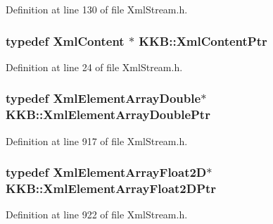 Definition at line 130 of file Xml\+Stream.\+h.

\subsubsection[{\texorpdfstring{Xml\+Content\+Ptr}{XmlContentPtr}}]{\setlength{\rightskip}{0pt plus 5cm}typedef {\bf Xml\+Content} $\ast$ {\bf K\+K\+B\+::\+Xml\+Content\+Ptr}}\hypertarget{namespace_k_k_b_a0ac08d955397a4ffcc62ce7aab18105f}{}\label{namespace_k_k_b_a0ac08d955397a4ffcc62ce7aab18105f}


Definition at line 24 of file Xml\+Stream.\+h.

\subsubsection[{\texorpdfstring{Xml\+Element\+Array\+Double\+Ptr}{XmlElementArrayDoublePtr}}]{\setlength{\rightskip}{0pt plus 5cm}typedef {\bf Xml\+Element\+Array\+Double}$\ast$ {\bf K\+K\+B\+::\+Xml\+Element\+Array\+Double\+Ptr}}\hypertarget{namespace_k_k_b_a890e530a492707fdf8f96e9e5122f211}{}\label{namespace_k_k_b_a890e530a492707fdf8f96e9e5122f211}


Definition at line 917 of file Xml\+Stream.\+h.

\subsubsection[{\texorpdfstring{Xml\+Element\+Array\+Float2\+D\+Ptr}{XmlElementArrayFloat2DPtr}}]{\setlength{\rightskip}{0pt plus 5cm}typedef {\bf Xml\+Element\+Array\+Float2D}$\ast$ {\bf K\+K\+B\+::\+Xml\+Element\+Array\+Float2\+D\+Ptr}}\hypertarget{namespace_k_k_b_a7a2268645924b20496fe73e4be0fe453}{}\label{namespace_k_k_b_a7a2268645924b20496fe73e4be0fe453}


Definition at line 922 of file Xml\+Stream.\+h.

